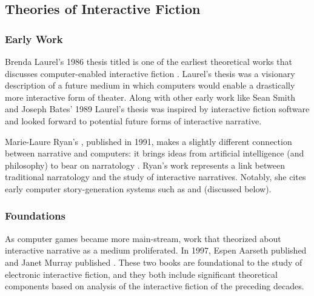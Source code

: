 \subsection{Theories of Interactive Fiction}

\subsubsection{Early Work}

Brenda Laurel's 1986 thesis titled  is one of the earliest theoretical works that discusses computer-enabled interactive fiction \citep{Laurel1986}.
%
Laurel's thesis was a visionary description of a future medium in which computers would enable a drastically more interactive form of theater.
%
Along with other early work like Sean Smith and Joseph Bates' 1989  \citep{Smith1989} Laurel's thesis was inspired by interactive fiction software and looked forward to potential future forms of interactive narrative.


Marie-Laure Ryan's , published in 1991, makes a slightly different connection between narrative and computers: it brings ideas from artificial intelligence (and philosophy) to bear on narratology \citep{Ryan1991}.
%
Ryan's work represents a link between traditional narratology and the study of interactive narratives.
%
Notably, she cites early computer story-generation systems such as  and  (discussed below).


\subsubsection{Foundations}

As computer games became more main-stream, work that theorized about interactive narrative as a medium proliferated. 
%
In 1997, Espen Aarseth published  and Janet Murray published  \citep{Aarseth1997,Murray1997}.
%
These two books are foundational to the study of electronic interactive fiction, and they both include significant theoretical components based on analysis of the interactive fiction of the preceding decades.


